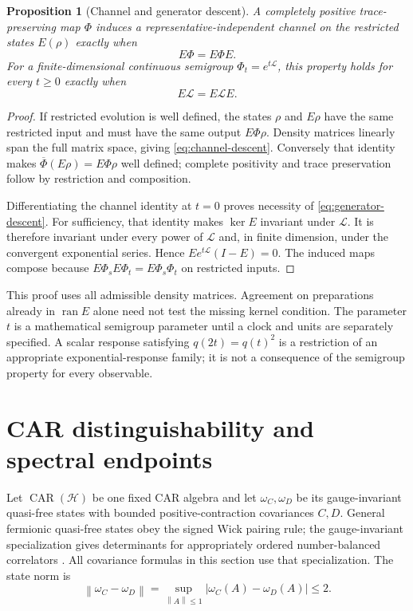 \documentclass[11pt]{article}
\newcommand{\norm}[1]{\left\|#1\right\|}
\newtheorem{proposition}[theorem]{Proposition}
\theoremstyle{definition}
\begin{document}
\begin{proposition}[Channel and generator descent]
\label{prop:descent}
A completely positive trace-preserving map $\Phi$ induces a representative-independent
channel on the restricted states $E(\rho)$ exactly when
\begin{equation}
E\Phi=E\Phi E.
\label{eq:channel-descent}
\end{equation}
For a finite-dimensional continuous semigroup $\Phi_t=e^{t\mathcal L}$,
this property holds for every $t\ge0$ exactly when
\begin{equation}
E\mathcal L=E\mathcal L E.
\label{eq:generator-descent}
\end{equation}
\end{proposition}
\begin{proof}
If restricted evolution is well defined, the states $\rho$ and $E\rho$
have the same restricted input and must have the same output $E\Phi\rho$.
Density matrices linearly span the full matrix space, giving
\eqref{eq:channel-descent}. Conversely that identity makes
$\overline\Phi(E\rho)=E\Phi\rho$ well defined; complete positivity and trace
preservation follow by restriction and composition.

Differentiating the channel identity at $t=0$ proves necessity of
\eqref{eq:generator-descent}. For sufficiency, that identity makes
$\ker E$ invariant under $\mathcal L$. It is therefore invariant under every
power of $\mathcal L$ and, in finite dimension, under the convergent exponential
series. Hence $E e^{t\mathcal L}(I-E)=0$. The induced maps compose because
$E\Phi_sE\Phi_t=E\Phi_s\Phi_t$ on restricted inputs.
\end{proof}

This proof uses all admissible density matrices. Agreement on preparations
already in $\operatorname{ran}E$ alone need not test the missing kernel
condition. The parameter $t$ is a mathematical semigroup parameter until a
clock and units are separately specified. A scalar response satisfying
$q(2t)=q(t)^2$ is a restriction of an appropriate exponential-response family;
it is not a consequence of the semigroup property for every observable.

\section{CAR distinguishability and spectral endpoints}
\label{sec:car-results}
Let $\operatorname{CAR}(\mathcal H)$ be one fixed CAR algebra and let
$\omega_C,\omega_D$ be its gauge-invariant quasi-free states with bounded
positive-contraction covariances $C,D$. General fermionic quasi-free states
obey the signed Wick pairing rule; the gauge-invariant specialization gives
determinants for appropriately ordered number-balanced correlators
\cite{araki}. All covariance formulas in this section use that specialization.
The state norm is
\[
\norm{\omega_C-\omega_D}
=\sup_{\norm{A}\le1}|\omega_C(A)-\omega_D(A)|\le2.
\]
\end{document}
